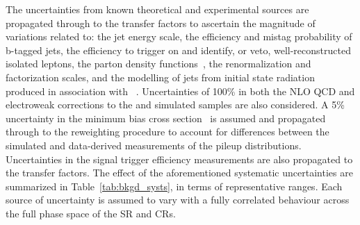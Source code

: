 The uncertainties from known theoretical and experimental sources are
propagated through to the transfer factors to ascertain the magnitude
of variations related to: the jet energy scale, the efficiency and
mistag probability of b-tagged jets, the efficiency to trigger on and
identify, or veto, well-reconstructed isolated leptons, 
the parton density functions~\cite{Butterworth:2015oua}, the
renormalization and factorization scales, and the modelling of jets
from initial state radiation produced in association with
\ttbar~\cite{single-lepton-stop}. Uncertainties of 100\% in both the
NLO QCD and electroweak corrections to the \wj and \zj simulated
samples are also considered. A 5\% uncertainty in the minimum bias
cross section~\cite{Aaboud:2016mmw} is assumed and propagated through
to the reweighting procedure to account for differences between the
simulated and data-derived measurements of the pileup
distributions. Uncertainties in the signal trigger efficiency
measurements are also propagated to the transfer factors. The effect
of the aforementioned systematic uncertainties are summarized in
Table~\ref{tab:bkgd_systs}, in terms of representative ranges.  Each
source of uncertainty is assumed to vary with a fully correlated
behaviour across the full phase space of the SR and CRs.

